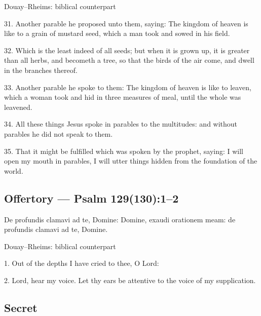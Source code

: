 \begin{englishwitness}{Douay--Rheims: biblical counterpart}

31. Another parable he proposed unto them, saying: The kingdom of heaven is like to a grain of mustard seed, which a man took and sowed in his field.

32. Which is the least indeed of all seeds; but when it is grown up, it is greater than all herbs, and becometh a tree, so that the birds of the air come, and dwell in the branches thereof.

33. Another parable he spoke to them: The kingdom of heaven is like to leaven, which a woman took and hid in three measures of meal, until the whole was leavened.

34. All these things Jesus spoke in parables to the multitudes: and without parables he did not speak to them.

35. That it might be fulfilled which was spoken by the prophet, saying: I will open my mouth in parables, I will utter things hidden from the foundation of the world.

\end{englishwitness}

\subsection{Offertory --- Psalm 129(130):1–2}

\label{proper-offertory}


\begin{latinproper}

De profundis clamavi ad te, Domine: Domine, exaudi orationem meam: de profundis clamavi ad te, Domine.

\end{latinproper}

\begin{englishwitness}{Douay--Rheims: biblical counterpart}

1. Out of the depths I have cried to thee, O Lord:

2. Lord, hear my voice. Let thy ears be attentive to the voice of my supplication.

\end{englishwitness}

\subsection{Secret}

